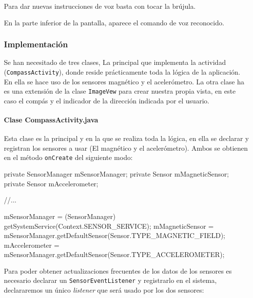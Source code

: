 \documentclass[	DIV=calc,%
							paper=a4,%
							fontsize=11pt]{scrartcl}	 					%
\begin{document}
Para dar nuevas instrucciones de voz basta con tocar la brújula.

En la parte inferior de la pantalla, aparece el comando de voz
reconocido.

\subsubsection{Implementación}\label{implementaciuxf3n}

Se han necesitado de tres clases, La principal que implementa la
actividad (\texttt{CompassActivity}), donde reside prácticamente toda la
lógica de la aplicación. En ella se hace uso de los sensores magnético y
el acelerómetro. La otra clase ha es una extensión de la clase
\texttt{ImageVew} para crear nuestra propia vista, en este caso el
compás y el indicador de la dirección indicada por el usuario.

\paragraph{Clase CompassActivity.java}\label{clase-compassactivity.java}

Esta clase es la principal y en la que se realiza toda la lógica, en
ella se declarar y registran los sensores a usar (El magnético y el
acelerómetro). Ambos se obtienen en el método \texttt{onCreate} del
siguiente modo:

\begin{javacode}
	private SensorManager mSensorManager;
	private Sensor mMagneticSensor;
	private Sensor mAccelerometer;

	//...

	mSensorManager = (SensorManager) getSystemService(Context.SENSOR_SERVICE);
	mMagneticSensor = mSensorManager.getDefaultSensor(Sensor.TYPE_MAGNETIC_FIELD);
	mAccelerometer = mSensorManager.getDefaultSensor(Sensor.TYPE_ACCELEROMETER);
\end{javacode}

Para poder obtener actualizaciones frecuentes de los datos de los
sensores es necesario declarar un \texttt{SensorEventListener} y
registrarlo en el sistema, declararemos un único \emph{listener} que
será usado por los dos sensores:
\end{document}
